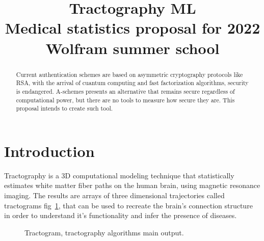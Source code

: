 \documentclass[conference]{IEEEtran}
\begin{document}
\title{
Tractography ML  \\
{\footnotesize Medical statistics proposal for 2022 Wolfram summer school}
}

\author{
}

\maketitle

\begin{abstract}
    Current authentication schemes are based on asymmetric cryptography protocols like RSA, with the arrival of cuantum computing and fast factorization algorithms, security is endangered. A-schemes presents an alternative that remains secure regardless of computational power, but there are no tools to measure how secure they are. This proposal intends to create such tool.
\end{abstract}

%
%
\section{Introduction}
Tractography is a 3D computational modeling technique that statistically estimates white matter fiber paths on the human brain, using magnetic resonance imaging. The results are arrays of three dimensional trajectories called tractograms fig~\ref{tractogram}, that can be used to recreate the brain's connection structure in order to understand it's functionality and infer the presence of diseases.

\begin{figure}[htbp]
    \centerline{
    }
    \caption{Tractogram, tractography algorithms main output.}
    \label{tractogram}
\end{figure}
\end{document}
